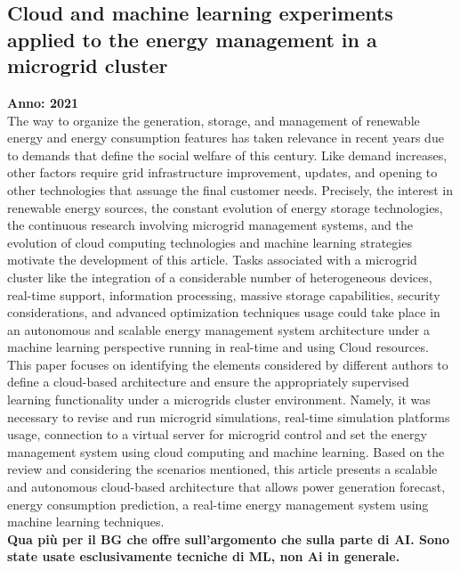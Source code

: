 \subsection{Cloud and machine learning experiments applied to the energy management in a microgrid cluster}
\textbf{Anno: 2021}~\cite{rosero2021cloud}\\
The way to organize the generation, storage, and management of renewable energy and energy consumption
features has taken relevance in recent years due to demands that define the social welfare of this century. Like
demand increases, other factors require grid infrastructure improvement, updates, and opening to other technologies that assuage the final customer needs. Precisely, the interest in renewable energy sources, the constant
evolution of energy storage technologies, the continuous research involving microgrid management systems, and
the evolution of cloud computing technologies and machine learning strategies motivate the development of this
article. Tasks associated with a microgrid cluster like the integration of a considerable number of heterogeneous
devices, real-time support, information processing, massive storage capabilities, security considerations, and
advanced optimization techniques usage could take place in an autonomous and scalable energy management
system architecture under a machine learning perspective running in real-time and using Cloud resources. This
paper focuses on identifying the elements considered by different authors to define a cloud-based architecture
and ensure the appropriately supervised learning functionality under a microgrids cluster environment. Namely,
it was necessary to revise and run microgrid simulations, real-time simulation platforms usage, connection to a
virtual server for microgrid control and set the energy management system using cloud computing and machine
learning. Based on the review and considering the scenarios mentioned, this article presents a scalable and
autonomous cloud-based architecture that allows power generation forecast, energy consumption prediction, a
real-time energy management system using machine learning techniques. \\
\textbf{Qua più per il BG che offre sull'argomento che sulla parte di AI. Sono state usate esclusivamente tecniche di ML, non Ai in generale.}

